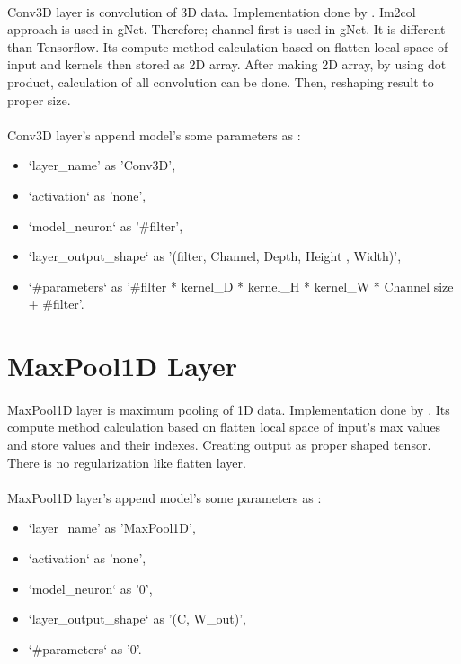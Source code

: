 \documentclass[12pt]{report}
\begin{document}
\paragraph{}
Conv3D layer is convolution of 3D data. Implementation done by \cite{MGK}. Im2col approach is used in gNet. Therefore; channel first is used in gNet. It is different than Tensorflow. Its compute method calculation based on flatten local space of input and kernels then stored as 2D array. After making 2D array, by using dot product, calculation of all convolution can be done. Then, reshaping result to proper size. 

\paragraph{}
Conv3D layer's append model's some parameters as :
\begin{itemize}
	\item `layer\_name' as 'Conv3D',
	\item `activation` as 'none',
	\item `model\_neuron` as '\#filter',
	\item `layer\_output\_shape` as '(filter, Channel, Depth, Height , Width)',
	\item `\#parameters` as '\#filter * kernel\_D * kernel\_H * kernel\_W * Channel size + \#filter'.
\end{itemize}



\section{MaxPool1D Layer}

\paragraph{}
MaxPool1D layer is maximum pooling of 1D data. Implementation done by \cite{MGK}. Its compute method calculation based on flatten local space of input's max values and store values and their indexes. Creating output as proper shaped tensor. There is no regularization like flatten layer.

\paragraph{}
MaxPool1D layer's append model's some parameters as :
\begin{itemize}
	\item `layer\_name' as 'MaxPool1D',
	\item `activation` as 'none',
	\item `model\_neuron` as '0',
	\item `layer\_output\_shape` as '(C, W\_out)',
	\item `\#parameters` as '0'.
\end{itemize}
\end{document}
